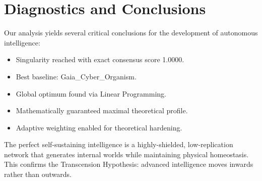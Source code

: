 \documentclass{article}
\begin{document}
\section{Diagnostics and Conclusions}
Our analysis yields several critical conclusions for the development of autonomous intelligence:

\begin{itemize}
\item Singularity reached with exact consensus score 1.0000.
\item Best baseline: Gaia_Cyber_Organism.
\item Global optimum found via Linear Programming.
\item Mathematically guaranteed maximal theoretical profile.
\item Adaptive weighting enabled for theoretical hardening.
\end{itemize}

The perfect self-sustaining intelligence is a highly-shielded, low-replication network that generates internal worlds while maintaining physical homeostasis. This confirms the Transcension Hypothesis: advanced intelligence moves inwards rather than outwards.
\end{document}

